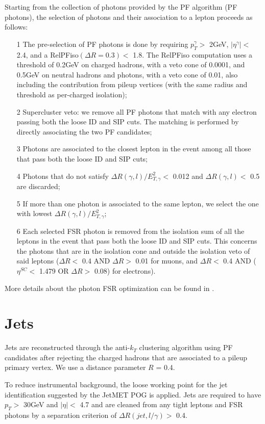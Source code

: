 Starting from the collection of photons provided by the PF algorithm (PF photons), the selection of photons and their association to a lepton proceeds as follows:
\begin{itemize}
	\item[1] The pre-selection of PF photons is done by requiring $p_{T}^{\gamma}>$ 2GeV, $|\eta^{\gamma}|<$ 2.4, and a RelPFiso$(\Delta R=0.3)<$ 1.8. The RelPFiso computation uses a threshold of 0.2GeV on charged hadrons, with a veto cone of 0.0001, and 0.5GeV on neutral hadrons and photons, with a veto cone of 0.01, also including the contribution from pileup vertices (with the same radius and threshold as per-charged isolation);
	\item[2] Supercluster veto: we remove all PF photons that match with any electron passing both the loose ID and SIP cuts. The matching is performed by directly associating the two PF candidates;
	\item[3] Photons are associated to the closest lepton in the event among all those that pass both the loose ID and SIP cuts;
	\item[4] Photons that do not satisfy $\Delta R(\gamma,l)/E_{T,\gamma}^{2}<$ 0.012 and $\Delta R(\gamma,l)<$ 0.5 are discarded;
	\item[5] If more than one photon is associated to the same lepton, we select the one with lowest $\Delta R(\gamma,l)/E_{T,\gamma}^{2}$;
	\item[6] Each selected FSR photon is removed from the isolation sum of all the leptons in the event that pass both the loose ID and SIP cuts. This concerns the photons that are in the isolation cone and outside the isolation veto of said leptons ($\Delta R<$ 0.4 AND $\Delta R>$ 0.01 for muons, and $\Delta R<$ 0.4 AND ($\eta^{SC}<$ 1.479 OR $\Delta R>$ 0.08) for electrons).
\end{itemize}

More details about the photon FSR optimization can be found in \cite{bib:CMS-AN-15-277,bib:CMS-AN-16-442}.


\section{Jets}
Jets are reconstructed through the anti-$k_{T}$ clustering algorithm using PF candidates after rejecting the charged hadrons that are associated to a pileup primary vertex. We use a distance parameter $R$ = 0.4.

To reduce instrumental background, the loose working point for the jet identification suggested by the JetMET POG is applied. Jets are required to have $p_{T}>$ 30GeV and $|\eta|<$ 4.7 and are cleaned from any tight leptons and FSR photons by a separation criterion of $\Delta R(jet,l/\gamma)>$ 0.4.

